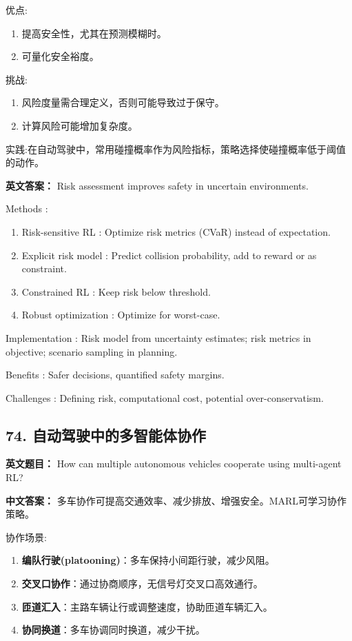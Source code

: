 \documentclass[10pt,a4paper]{ctexart}
\begin{document}
 优点:
\begin{enumerate}
    \item 提高安全性，尤其在预测模糊时。
    \item 可量化安全裕度。
\end{enumerate}

 挑战:
\begin{enumerate}
    \item 风险度量需合理定义，否则可能导致过于保守。
    \item 计算风险可能增加复杂度。
\end{enumerate}

 实践:在自动驾驶中，常用碰撞概率作为风险指标，策略选择使碰撞概率低于阈值的动作。

\textbf{英文答案：}  
Risk assessment improves safety in uncertain environments.

 Methods :
\begin{enumerate}
    \item Risk-sensitive RL : Optimize risk metrics (CVaR) instead of expectation.
    \item Explicit risk model : Predict collision probability, add to reward or as constraint.
    \item Constrained RL : Keep risk below threshold.
    \item Robust optimization : Optimize for worst-case.
\end{enumerate}

 Implementation : Risk model from uncertainty estimates; risk metrics in objective; scenario sampling in planning.

 Benefits : Safer decisions, quantified safety margins.

 Challenges : Defining risk, computational cost, potential over-conservatism.

\subsection*{74. 自动驾驶中的多智能体协作}
\textbf{英文题目：} How can multiple autonomous vehicles cooperate using multi-agent RL?

\textbf{中文答案：}  
多车协作可提高交通效率、减少排放、增强安全。MARL可学习协作策略。

 协作场景:
\begin{enumerate}
    \item \textbf{编队行驶(platooning)}：多车保持小间距行驶，减少风阻。
    \item \textbf{交叉口协作}：通过协商顺序，无信号灯交叉口高效通行。
    \item \textbf{匝道汇入}：主路车辆让行或调整速度，协助匝道车辆汇入。
    \item \textbf{协同换道}：多车协调同时换道，减少干扰。
\end{enumerate}
\end{document}
